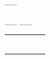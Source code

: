 \documentclass[11pt,a4paper]{article}
\begin{document}
\begin{table}[!ht]
  \centering
  \begin{minipage}{0.08\textwidth}
    \centering

\vfillFirst

\_\_


\vfillLast

  \end{minipage}
  \hfillx
  \begin{minipage}{0.37\textwidth}
    \centering

\begin{center}

\_\_  \_\_


\medskip


\begin{tabular}{|C{0.75cm} | C{0.75cm}|C{0.75cm}|C{0.75cm}|C{0.75cm}|}
\hline
{}  &   &  &  &  \\
  &   &  &  &  \\
\hline
{}  &  & & & \\
  &  & & & \\ \hline
{}  &  & & & \\
  &  & & & \\ \hline
\end{tabular}
\end{center}

  \end{minipage}
  \hfillx
  \begin{minipage}{0.55\textwidth}
    \centering

\vfillFirst

\phantom{42}


\vfillLast

  \end{minipage}
\end{table}
\end{document}

